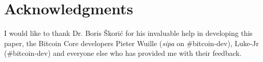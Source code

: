 \section{Acknowledgments}
I would like to thank Dr. Boris \v{S}kori\'{c} for his invaluable help in developing this paper, the Bitcoin Core developers Pieter Wuille (\textit{sipa} on \#bitcoin-dev), Luke-Jr (\#bitcoin-dev) and everyone else who has provided me with their feedback.
